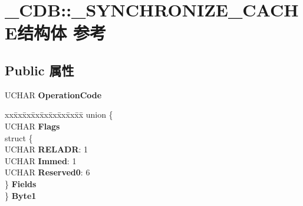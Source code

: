 \hypertarget{struct___c_d_b_1_1___s_y_n_c_h_r_o_n_i_z_e___c_a_c_h_e}{}\section{\+\_\+\+C\+DB\+:\+:\+\_\+\+S\+Y\+N\+C\+H\+R\+O\+N\+I\+Z\+E\+\_\+\+C\+A\+C\+H\+E结构体 参考}
\label{struct___c_d_b_1_1___s_y_n_c_h_r_o_n_i_z_e___c_a_c_h_e}
\subsection*{Public 属性}
\begin{DoxyCompactItemize}
\item 
\mbox{\label{struct___c_d_b_1_1___s_y_n_c_h_r_o_n_i_z_e___c_a_c_h_e_a76c905f90779fcd224a85ac35952e38f}} 
U\+C\+H\+AR {\bfseries Operation\+Code}
\item 
\mbox{\label{struct___c_d_b_1_1___s_y_n_c_h_r_o_n_i_z_e___c_a_c_h_e_a1b00a905f96d6371fedcbc87ba7b5484}} 
\begin{tabbing}
xx\=xx\=xx\=xx\=xx\=xx\=xx\=xx\=xx\=\kill
union \{\\
\>UCHAR {\bfseries Flags}\\
\>struct \{\\
\>\>UCHAR {\bfseries RELADR}: 1\\
\>\>UCHAR {\bfseries Immed}: 1\\
\>\>UCHAR {\bfseries Reserved0}: 6\\
\>\} {\bfseries Fields}\\
\} {\bfseries Byte1}\\


\end{tabbing}
\end{DoxyCompactItemize}
